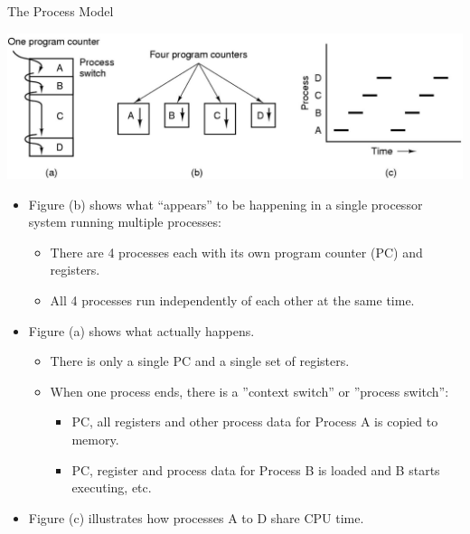 \documentclass[12pt,a4paper]{article}
\theoremstyle{definition}
\newenvironment{myitemize}
{ \begin{itemize}
    \setlength{\itemsep}{5pt}
    \setlength{\parskip}{0pt}
    \setlength{\parsep}{0pt}     }
{ \end{itemize}                  }
\begin{document}
\begin{tcolorbox}
	\textsf{The Process Model}
	
	\includegraphics[scale=0.5]{m1/processModel}
	\centering
	
	\begin{myitemize}
		\item Figure (b) shows what “appears” to be happening in a single processor system running multiple processes:
		\begin{myitemize}
			\item There are 4 processes each with its own program counter (PC) and registers.
			\item All 4 processes run independently of each other at the same time.
		\end{myitemize}
		\item Figure (a) shows what actually happens.
		\begin{myitemize}
			\item There is only a single PC and a single set of registers.
			\item When one process ends, there is a ''context switch'' or ''process switch'':
			\begin{myitemize}
				\item PC, all registers and other process data for Process A is copied to memory.
				\item PC, register and process data for Process B is loaded and B starts executing, etc.
			\end{myitemize}
		\end{myitemize}
		\item Figure (c) illustrates how processes A to D share CPU time.
	\end{myitemize}
\end{tcolorbox}
\end{document}
